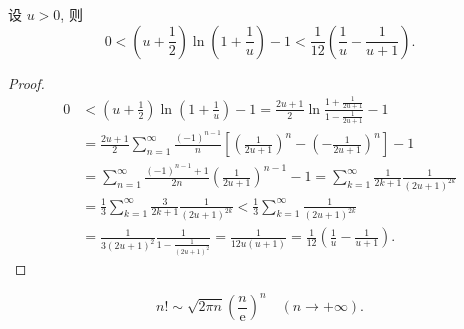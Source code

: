 \begin{lemma}\label{lem:15.4.2}
设 $u>0$, 则
\[
  0<\left(u+\frac{1}{2}\right)\ln\left(1+\frac{1}{u}\right)-1<\frac{1}{12}\left(\frac{1}{u}-\frac{1}{u+1}\right).
\]
\end{lemma}

\begin{proof}
\[
  \begin{aligned}
    0&<\left(u+\frac{1}{2}\right)\ln\left(1+\frac{1}{u}\right)-1=\frac{2u+1}{2}\ln\frac{1+\frac{1}{2u+1}}{1-\frac{1}{2u+1}}-1\\
    &=\frac{2u+1}{2}\sum_{n=1}^{\infty}\frac{(-1)^{n-1}}{n}\left[\left(\frac{1}{2u+1}\right)^{n}-\left(-\frac{1}{2u+1}\right)^{n}\right]-1\\
    &=\sum_{n=1}^{\infty}\frac{(-1)^{n-1}+1}{2n}\left(\frac{1}{2u+1}\right)^{n-1}-1=\sum_{k=1}^{\infty}\frac{1}{2k+1}\frac{1}{(2u+1)^{2k}}\\
    &=\frac{1}{3}\sum_{k=1}^{\infty}\frac{3}{2k+1}\frac{1}{(2u+1)^{2k}}<\frac{1}{3}\sum_{k=1}^{\infty}\frac{1}{(2u+1)^{2k}}\\
    &=\frac{1}{3(2u+1)^{2}}\frac{1}{1-\frac{1}{(2u+1)^{2}}}=\frac{1}{12u(u+1)}=\frac{1}{12}\left(\frac{1}{u}-\frac{1}{u+1}\right).
  \end{aligned}
\]
\end{proof}

\begin{lemma}\label{lem:15.4.3}
\[
  n!\sim\sqrt{2\pi n}\left(\frac{n}{\mathrm{e}}\right)^{n}\quad(n\to+\infty).
\]
\end{lemma}

